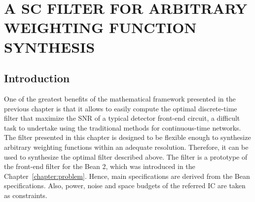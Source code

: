 \chapter{A SC FILTER FOR ARBITRARY WEIGHTING FUNCTION SYNTHESIS}
\label{chapter:introduction}
\section{Introduction}



One of the greatest benefits of the mathematical framework presented in the previous chapter is that it allows to easily compute the optimal discrete-time filter that maximize the SNR of a typical detector front-end circuit, a difficult task to undertake using the traditional methods for continuous-time networks. The filter presented in this chapter is designed to be flexible enough to synthesize arbitrary weighting functions within an adequate resolution. Therefore, it can be used to synthesize the optimal filter described above. The filter is a prototype of the front-end filter for the Bean 2, which was introduced in the Chapter~\ref{chapter:problem}. Hence, main specifications are derived from the Bean specifications. Also, power, noise and space budgets of the referred IC are taken as constraints.

